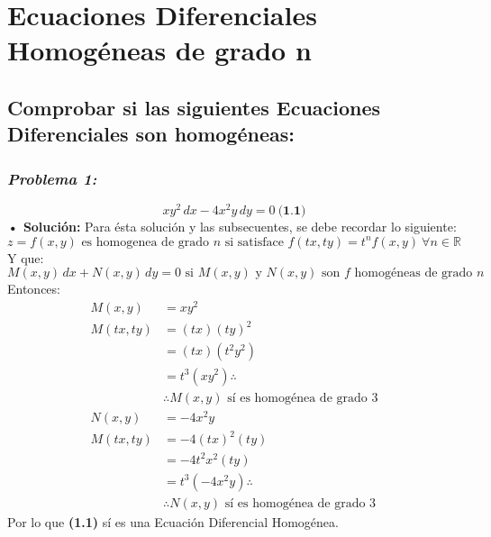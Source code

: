 \documentclass[letterpaper, 12pt]{article}
\begin{document}
\thispagestyle{fancy}
\section*{Ecuaciones Diferenciales Homogéneas de grado n}
\subsection*{Comprobar si las siguientes Ecuaciones Diferenciales son homogéneas:}
\subsubsection*{\emph{Problema 1:}}
\[xy^2\, dx-4x^2y\, dy=0\: \textbf{(1.1)}\]
\justify
\textbf{ • Solución:}
Para ésta solución y las subsecuentes, se debe recordar lo siguiente:
\[z=f(x,y) \text{ es homogenea de grado } n \text{ si satisface } f(tx,ty)=t^nf(x,y)\: \forall n\in\mathbb{R}\]
Y que:
\[M(x,y)\, dx+N(x,y)\, dy=0 \text{ si }M(x,y)\text{ y }N(x,y) \text{ son }f \text{ homogéneas de grado }n\]
Entonces:
\begin{equation*}
    \begin{aligned}
        M(x,y)&=xy^2\\[5pt]
        M(tx,ty)&=(tx)(ty)^2\\[5pt]
                &=(tx)(t^2y^2)\\[5pt]
                &=t^3(xy^2) \therefore\\[5pt]
                &\therefore M(x,y) \text{ sí es homogénea de grado } 3\\[10pt]
        N(x,y)&=-4x^2y\\[5pt]
        M(tx,ty)&=-4(tx)^2(ty)\\[5pt]
                &=-4t^2x^2(ty)\\[5pt]
                &=t^3(-4x^2y) \therefore\\[5pt] 
                &\therefore N(x,y) \text{ sí es homogénea de grado } 3
    \end{aligned}
\end{equation*}
Por lo que \textbf{(1.1)} sí es una Ecuación Diferencial Homogénea.
\newpage
\end{document}
